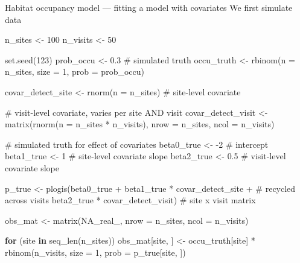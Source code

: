 \documentclass[
  10pt,
  ignorenonframetext,
  aspectratio=169,
  t]{beamer}
\newenvironment{Shaded}{\begin{snugshade}}{\end{snugshade}}
\newcommand{\AttributeTok}[1]{\textcolor[rgb]{0.40,0.45,0.13}{#1}}
\newcommand{\CommentTok}[1]{\textcolor[rgb]{0.37,0.37,0.37}{#1}}
\newcommand{\ConstantTok}[1]{\textcolor[rgb]{0.56,0.35,0.01}{#1}}
\newcommand{\ControlFlowTok}[1]{\textcolor[rgb]{0.00,0.23,0.31}{\textbf{#1}}}
\newcommand{\DecValTok}[1]{\textcolor[rgb]{0.68,0.00,0.00}{#1}}
\newcommand{\FloatTok}[1]{\textcolor[rgb]{0.68,0.00,0.00}{#1}}
\newcommand{\FunctionTok}[1]{\textcolor[rgb]{0.28,0.35,0.67}{#1}}
\newcommand{\NormalTok}[1]{\textcolor[rgb]{0.00,0.23,0.31}{#1}}
\newcommand{\OtherTok}[1]{\textcolor[rgb]{0.00,0.23,0.31}{#1}}
\newcommand{\SpecialCharTok}[1]{\textcolor[rgb]{0.37,0.37,0.37}{#1}}
\begin{document}
\begin{frame}[fragile]{Habitat occupancy model --- fitting a model with
covariates}
\protect{}\label{habitat-occupancy-model-fitting-a-model-with-covariates}
We first simulate data

\scriptsize

\begin{Shaded}
\begin{Highlighting}[]
\NormalTok{n\_sites }\OtherTok{\textless{}{-}} \DecValTok{100}
\NormalTok{n\_visits }\OtherTok{\textless{}{-}} \DecValTok{50}

\FunctionTok{set.seed}\NormalTok{(}\DecValTok{123}\NormalTok{)}
\NormalTok{prob\_occu }\OtherTok{\textless{}{-}} \FloatTok{0.3}  \CommentTok{\# simulated truth}
\NormalTok{occu\_truth }\OtherTok{\textless{}{-}} \FunctionTok{rbinom}\NormalTok{(}\AttributeTok{n =}\NormalTok{ n\_sites, }\AttributeTok{size =} \DecValTok{1}\NormalTok{, }\AttributeTok{prob =}\NormalTok{ prob\_occu)}

\NormalTok{covar\_detect\_site }\OtherTok{\textless{}{-}} \FunctionTok{rnorm}\NormalTok{(}\AttributeTok{n =}\NormalTok{ n\_sites) }\CommentTok{\# site{-}level covariate}

\CommentTok{\# visit{-}level covariate, varies per site AND visit}
\NormalTok{covar\_detect\_visit }\OtherTok{\textless{}{-}} \FunctionTok{matrix}\NormalTok{(}\FunctionTok{rnorm}\NormalTok{(}\AttributeTok{n =}\NormalTok{ n\_sites }\SpecialCharTok{*}\NormalTok{ n\_visits), }\AttributeTok{nrow =}\NormalTok{ n\_sites, }\AttributeTok{ncol =}\NormalTok{ n\_visits)}

\CommentTok{\# simulated truth for effect of covariates}
\NormalTok{beta0\_true }\OtherTok{\textless{}{-}} \SpecialCharTok{{-}}\DecValTok{2}   \CommentTok{\# intercept}
\NormalTok{beta1\_true }\OtherTok{\textless{}{-}} \DecValTok{1}    \CommentTok{\# site{-}level covariate slope}
\NormalTok{beta2\_true }\OtherTok{\textless{}{-}} \FloatTok{0.5}  \CommentTok{\# visit{-}level covariate slope}

\NormalTok{p\_true }\OtherTok{\textless{}{-}} \FunctionTok{plogis}\NormalTok{(beta0\_true }\SpecialCharTok{+}
\NormalTok{                 beta1\_true }\SpecialCharTok{*}\NormalTok{ covar\_detect\_site }\SpecialCharTok{+} \CommentTok{\# recycled across visits}
\NormalTok{                 beta2\_true }\SpecialCharTok{*}\NormalTok{ covar\_detect\_visit) }\CommentTok{\# site x visit matrix}

\NormalTok{obs\_mat }\OtherTok{\textless{}{-}} \FunctionTok{matrix}\NormalTok{(}\ConstantTok{NA\_real\_}\NormalTok{, }\AttributeTok{nrow =}\NormalTok{ n\_sites, }\AttributeTok{ncol =}\NormalTok{ n\_visits)}

\ControlFlowTok{for}\NormalTok{ (site }\ControlFlowTok{in} \FunctionTok{seq\_len}\NormalTok{(n\_sites))}
\NormalTok{  obs\_mat[site, ] }\OtherTok{\textless{}{-}}\NormalTok{ occu\_truth[site] }\SpecialCharTok{*} \FunctionTok{rbinom}\NormalTok{(n\_visits, }\AttributeTok{size =} \DecValTok{1}\NormalTok{, }\AttributeTok{prob =}\NormalTok{ p\_true[site, ])}
\end{Highlighting}
\end{Shaded}

\normalsize
\end{frame}
\end{document}
